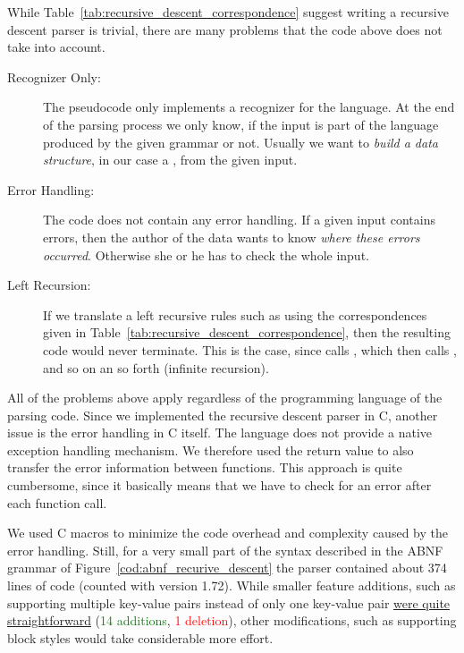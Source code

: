 While Table~\ref{tab:recursive_descent_correspondence} suggest writing a recursive descent parser is trivial, there are many problems that the code above does not take into account.

\begin{description}
  \item [Recognizer Only:] The pseudocode only implements a recognizer for the language. At the end of the parsing process we only know, if the input is part of the language produced by the given grammar or not. Usually we want to \emph{build a data structure}, in our case a , from the given input.

  \item [Error Handling:] The code does not contain any error handling. If a given input contains errors, then the author of the data wants to know \emph{where these errors occurred}. Otherwise she or he has to check the whole input.

  \item [Left Recursion:] If we translate a left recursive rules such as  using the correspondences given in Table~\ref{tab:recursive_descent_correspondence}, then the resulting code would never terminate. This is the case, since  calls , which then calls , and so on an so forth (infinite recursion).
\end{description}

All of the problems above apply regardless of the programming language of the parsing code. Since we implemented the recursive descent parser in C, another issue is the error handling in C itself. The language does not provide a native exception handling mechanism. We therefore used the return value to also transfer the error information between functions. This approach is quite cumbersome, since it basically means that we have to check for an error after each function call.

We used C macros to minimize the code overhead and complexity caused by the error handling. Still, for a very small part of the  syntax described in the ABNF grammar of Figure~\ref{cod:abnf_recurive_descent} the parser contained about 374 lines of code (counted with  version 1.72). While smaller feature additions, such as supporting multiple key-value pairs instead of only one key-value pair \href{https://github.com/ElektraInitiative/libelektra/commit/17aa7a6ea5d9261287104213dcba67f4d0a0fcbc}{were quite straightforward} (\textcolor{Green}{14 additions}, \textcolor{Red}{1 deletion}), other modifications, such as supporting block styles would take considerable more effort.

